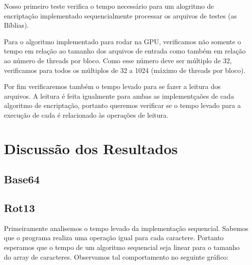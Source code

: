 \documentclass[12pt]{article}
\begin{document}
Nosso primeiro teste verifica o tempo necessário para um alogritmo de encriptação implementado sequencialmente processar os arquivos de testes (as Bíblias).

Para o algoritmo implementado para rodar na GPU, verificamos não somente o tempo em relação ao tamanho dos arquivos de entrada como também em relação ao número de threads por bloco. Como esse número deve ser múltiplo de 32, verificamos para todos os múltiplos de 32 a 1024 (máximo de threads por bloco).

Por fim verificaremos também o tempo levado para se fazer a leitura dos arquivos. A leitura é feita igualmente para ambas as implementçaões de cada algoritmo de encriptação, portanto queremos verificar se o tempo levado para a execução de cada é relacionado às operações de leitura.

\newpage
\section{Discussão dos Resultados}

\subsection{Base64}
\subsection{Rot13}

Primeiramente analisemos o tempo levado da implementação sequencial. Sabemos que o programa realiza uma operação igual para cada caractere. Portanto esperamos que o tempo de um algoritmo sequencial seja linear para o tamanho do array de caracteres. Observamos tal comportamento no seguinte gráfico:

\begin{figure}[H]
\end{figure}
\end{document}
